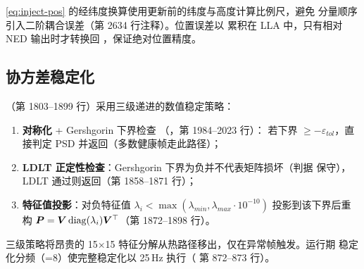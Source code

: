 \begin{remark}
\cref{eq:inject-pos} 的经纬度换算使用更新前的纬度与高度计算比例尺，避免
分量顺序引入二阶耦合误差（第 2634 行注释）。位置误差以  累积在
LLA 中，只有相对 NED 输出时才转换回 ，保证绝对位置精度。
\end{remark}

\subsection{协方差稳定化}

（第 1803--1899 行）采用三级递进的数值稳定策略：
\begin{enumerate}
  \item \textbf{对称化} + Gershgorin 下界检查
    （，第 1984--2023 行）：
    若下界 $\ge -\varepsilon_{tol}$，直接判定 PSD 并返回（多数健康帧走此路径）；
  \item \textbf{LDLT 正定性检查}：Gershgorin 下界为负并不代表矩阵损坏（判据
    保守），LDLT 通过则返回（第 1858--1871 行）；
  \item \textbf{特征值投影}：对负特征值 $\lambda_i < \max(\lambda_{min},
    \lambda_{max}\cdot 10^{-10})$ 投影到该下界后重构
    $\boldsymbol{P} = \boldsymbol{V}\operatorname{diag}(\lambda_i)\boldsymbol{V}^{\top}$（第 1872--1898 行）。
\end{enumerate}
三级策略将昂贵的 15$\times$15 特征分解从热路径移出，仅在异常帧触发。运行期
稳定化分频（=8）使完整稳定化以
25\,Hz 执行（ 第 872--873 行）。
